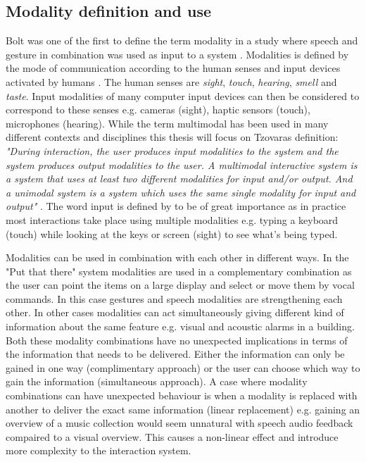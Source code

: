 \subsection{Modality definition and use}
Bolt was one of the first to define the term modality in a study where speech and gesture in combination was used as input to a system \cite{bolt_put-that-there:_1980}. Modalities is defined by the mode of communication according to the human senses and input devices activated by humans \cite{jaimes_multimodal_2007,tzovaras_dimitrios_multimodal_2008}. The human senses are \textit{sight}, \textit{touch}, \textit{hearing}, \textit{smell} and \textit{taste}. Input modalities of many computer input devices can then be considered to correspond to these senses e.g. cameras (sight), haptic sensors (touch), microphones (hearing). While the term multimodal has been used in many different contexts and disciplines this thesis will focus on Tzovaras definition: \textit{"During interaction, the user produces input modalities to the system and the system produces output modalities to the user. A multimodal interactive system is a system that uses at least two different modalities for input and/or output. And a unimodal system is a system which uses the same single modality for input and output"} \cite{tzovaras_dimitrios_multimodal_2008}. The word input is defined by \cite{jaimes_multimodal_2007} to be of great importance as in practice most interactions take place using multiple modalities e.g. typing a keyboard (touch) while looking at the keys or screen (sight) to see what's being typed.

Modalities can be used in combination with each other in different ways. In the "Put that there" system \cite{bolt_put-that-there:_1980} modalities are used in a complementary combination as the user can point the items on a large display and select or move them by vocal commands. In this case gestures and speech modalities are strengthening each other. In other cases modalities can act simultaneously giving different kind of information about the same feature e.g. visual and acoustic alarms in a building. Both these modality combinations have no unexpected implications in terms of the information that needs to be delivered. Either the information can only be gained in one way (complimentary approach) or the user can choose which way to gain the information (simultaneous approach). A case where modality combinations can have unexpected behaviour is when a modality is replaced with another to deliver the exact same information (linear replacement) e.g. gaining an overview of a music collection would seem unnatural with speech audio feedback compaired to a visual overview. This causes a non-linear effect and introduce more complexity to the interaction system.

